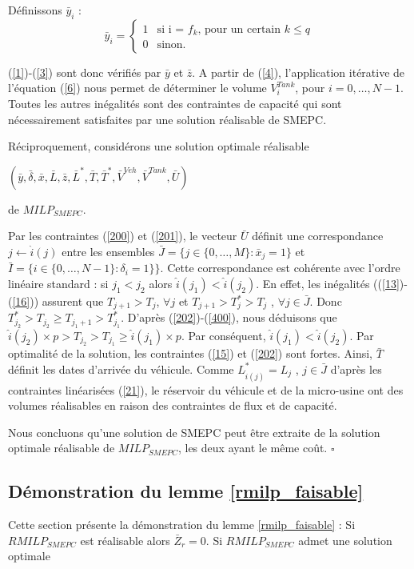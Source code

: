 {Définissons $\bar{y}_i$ :
$$
\bar{y}_i= \left\{
\begin{array}{ll}
1 & \mbox{si i = $f_k$, pour un certain $k \leq q$} \\
0 & \mbox{sinon.}
\end{array}
\right.
$$

(\ref{1})-(\ref{3}) sont donc vérifiés par $\bar{y}$ et $\bar{z}$. A partir de (\ref{4}), l'application itérative de l'équation (\ref{6}) nous permet de déterminer le volume $V^{Tank}_i$, pour $i = 0, \dots, N-1$. Toutes les autres inégalités sont des contraintes de capacité qui sont nécessairement satisfaites par une solution réalisable de SMEPC.

Réciproquement, considérons une solution optimale réalisable

$(\bar{y}, \bar{\delta}, \bar{x}, \bar{L}, \bar{z},\bar{L}^*, \bar{T}, \bar{T}^*, \bar{V}^{Veh}, \bar{V}^{Tank},\bar{U})$

de \textit{$MILP_{SMEPC}$}. 

Par les contraintes (\ref{200}) et (\ref{201}), le vecteur $\bar{U}$ définit une correspondance $j \leftarrow \hat{i}(j)$ entre les ensembles $\bar{J} = \{ j \in \{0, \dots, M\} : \bar{x}_j = 1\}$ et $\bar{I} = \{ i \in \{0, \dots , N-1\} : \delta_i = 1\}\}$. Cette correspondance est cohérente avec l'ordre linéaire standard : si $j_1 < j_2$ alors $\hat{i}(j_1) < \hat{i}(j_2)$. En effet, les inégalités ((\ref{13})-(\ref{16})) assurent que $T_{j+1} > T_j$, $\forall j$ et $T_{j+1} > T^*_j > T_j$ , $\forall j \in \bar{J}$. Donc $T_{j_2}^* > T_{j_2} \geq T_{j_1+1} > T_{j_1}^*$. D'après (\ref{202})-(\ref{400}), nous déduisons que $\hat{i}(j_2)\times p > T_{j_2} > T_{j_1} \geq \hat{i}(j_1) \times p$. Par conséquent, $\hat{i}(j_1) < \hat{i}(j_2)$.
Par optimalité de la solution, les contraintes (\ref{15}) et (\ref{202}) sont fortes. Ainsi, $\bar{T}$ définit les dates d'arrivée du véhicule. Comme $L_{\hat{i}(j)}^* = L_j$ , $j \in \bar{J}$ d'après les contraintes linéarisées (\ref{21}), le réservoir du véhicule et de la micro-usine ont des volumes réalisables en raison des contraintes de flux et de capacité.

Nous concluons qu'une solution de SMEPC peut être extraite de la solution optimale réalisable de \textit{$MILP_{SMEPC}$}, les deux ayant le même coût. $\square$



\subsection{Démonstration du lemme \ref{rmilp_faisable}}
\label{rmilp_faisable_section}
Cette section présente la démonstration du lemme \ref{rmilp_faisable} : Si \textit{$RMILP_{SMEPC}$} est réalisable alors $\bar{Z}_r=0$.
Si \textit{$RMILP_{SMEPC}$} admet une solution optimale

}
